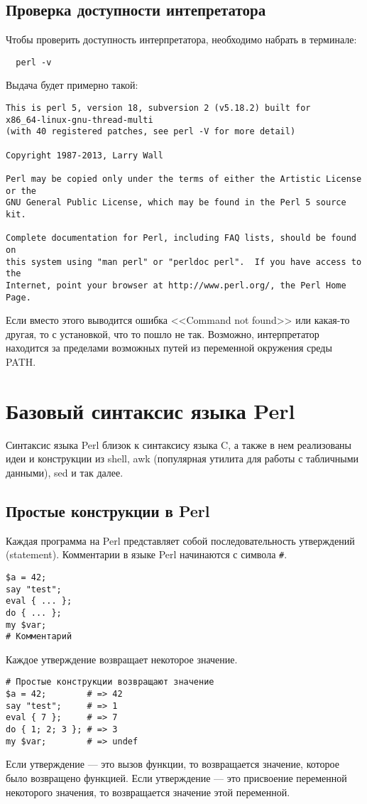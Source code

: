 \subsection{Проверка доступности интепретатора}
Чтобы проверить доступность интерпретатора, необходимо набрать в терминале:
\begin{verbatim}
  perl -v
\end{verbatim}
Выдача будет примерно такой:
\begin{verbatim}
This is perl 5, version 18, subversion 2 (v5.18.2) built for
x86_64-linux-gnu-thread-multi
(with 40 registered patches, see perl -V for more detail)

Copyright 1987-2013, Larry Wall

Perl may be copied only under the terms of either the Artistic License or the
GNU General Public License, which may be found in the Perl 5 source kit.

Complete documentation for Perl, including FAQ lists, should be found on
this system using "man perl" or "perldoc perl".  If you have access to the
Internet, point your browser at http://www.perl.org/, the Perl Home Page.
\end{verbatim}

Если вместо этого выводится ошибка <<Command not found>> или какая-то другая, то с установкой, что то пошло не так. Возможно, интерпретатор находится за пределами возможных путей из переменной окружения среды PATH.

\section{Базовый синтаксис языка Perl}
Синтаксис языка Perl близок к синтаксису языка C, а также в нем реализованы идеи и конструкции из shell, awk (популярная утилита для работы с табличными данными), sed и так далее.

\subsection{Простые конструкции в Perl}
Каждая программа на Perl представляет собой последовательность утверждений (statement). Комментарии в языке Perl начинаются с символа \verb|#|.
\begin{verbatim}
$a = 42;
say "test";
eval { ... };
do { ... };
my $var;
# Комментарий
\end{verbatim}
Каждое утверждение возвращает некоторое значение.
\begin{verbatim}
# Простые конструкции возвращают значение
$a = 42;        # => 42
say "test";     # => 1
eval { 7 };     # => 7
do { 1; 2; 3 }; # => 3
my $var;        # => undef
\end{verbatim}
Если утверждение --- это вызов функции, то возвращается значение, которое было возвращено функцией. Если утверждение --- это присвоение переменной некоторого значения, то возвращается значение этой переменной.

